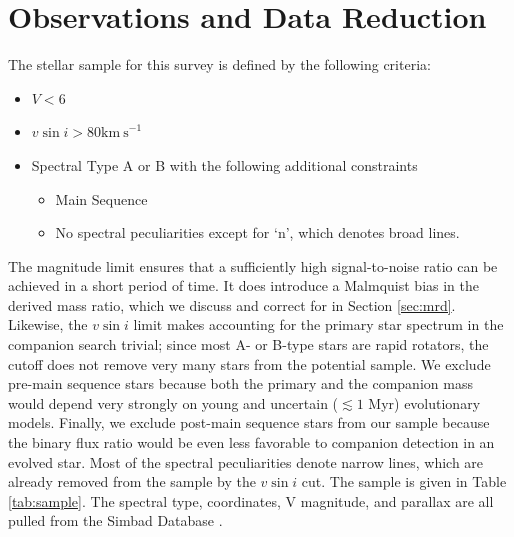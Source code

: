 \documentclass{emulateapj}
\begin{document}
\section{Observations and Data Reduction}
\label{sec:obs}

The stellar sample for this survey is defined by the following criteria:

\begin{itemize}
\item $V < 6$
\item $v\sin{i} > 80 \mathrm{km\ s}^{-1}$
\item Spectral Type A or B with the following additional constraints
\begin{itemize}
  \item Main Sequence
  \item No spectral peculiarities except for `n', which denotes broad lines.
\end{itemize}
\end{itemize}

The magnitude limit ensures that a sufficiently high signal-to-noise ratio can be achieved in a short period of time. It does introduce a Malmquist bias in the derived mass ratio, which we discuss and correct for in Section \ref{sec:mrd}. Likewise, the $v\sin{i}$ limit makes accounting for the primary star spectrum in the companion search trivial; since most A- or B-type stars are rapid rotators, the cutoff does not remove very many stars from the potential sample. We exclude pre-main sequence stars because both the primary and the companion mass would depend very strongly on young and uncertain ($\lesssim 1$ Myr) evolutionary models. Finally, we exclude post-main sequence stars from our sample because the binary flux ratio would be even less favorable to companion detection in an evolved star. Most of the spectral peculiarities denote narrow lines, which are already removed from the sample by the $v\sin{i}$ cut. The sample is given in Table \ref{tab:sample}. The spectral type, coordinates, V magnitude, and parallax are all pulled from the Simbad Database \citep{Simbad}.
\end{document}
